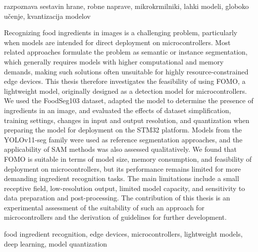 \documentclass[a4paper,twoside,openright,12pt,slovene]{book}
\begin{document}

\kljucnebesede
razpoznava sestavin hrane, robne naprave, mikrokrmilniki, lahki modeli, globoko učenje, kvantizacija modelov



\abstract

Recognizing food ingredients in images is a challenging problem, particularly
when models are intended for direct deployment on microcontrollers. Most
related approaches formulate the problem as semantic or instance segmentation,
which generally requires models with higher computational and memory demands,
making such solutions often unsuitable for highly resource-constrained edge
devices. This thesis therefore investigates the feasibility of using FOMO, a lightweight model, originally designed as a detection model for
microcontrollers. We used the FoodSeg103 dataset, adapted the model to
determine the presence of ingredients in an image, and evaluated the effects of
dataset simplification, training settings, changes in input and output
resolution, and quantization when preparing the model for deployment on the
STM32 platform.
Models from the YOLOv11-seg family were used as reference
segmentation approaches, and the applicability of SAM methods was also assessed
qualitatively.
We found that FOMO is suitable in terms of model size, memory
consumption, and feasibility of deployment on microcontrollers, but its
performance remains limited for more demanding ingredient recognition tasks.
The main limitations include a small receptive field, low-resolution output,
limited model capacity, and sensitivity to data preparation and
post-processing. The contribution of this thesis is an experimental assessment
of the suitability of such an approach for microcontrollers and the derivation
of guidelines for further development.

\keywords
food ingredient recognition, edge devices, microcontrollers, lightweight models, deep learning, model quantization


\tableofcontents

\seznamslik
\end{document}
